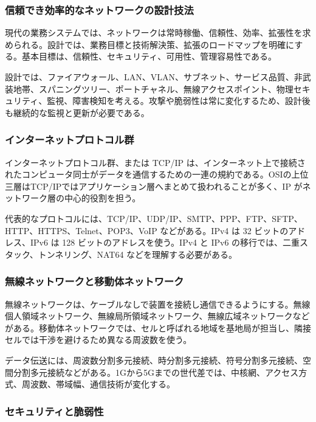 \documentclass[a4paper,11pt]{ltjsarticle}
\numberwithin{figure}{section}
\numberwithin{table}{section}
\begin{document}
\subsubsection{信頼でき効率的なネットワークの設計技法}

現代の業務システムでは、ネットワークは常時稼働、信頼性、効率、拡張性を求められる。設計では、業務目標と技術解決策、拡張のロードマップを明確にする。基本目標は、信頼性、セキュリティ、可用性、管理容易性である。

設計では、ファイアウォール、LAN、VLAN、サブネット、サービス品質、非武装地帯、スパニングツリー、ポートチャネル、無線アクセスポイント、物理セキュリティ、監視、障害検知を考える。攻撃や脆弱性は常に変化するため、設計後も継続的な監視と更新が必要である。

\subsubsection{インターネットプロトコル群}

インターネットプロトコル群、または TCP/IP は、インターネット上で接続されたコンピュータ同士がデータを通信するための一連の規約である。OSIの上位三層はTCP/IPではアプリケーション層へまとめて扱われることが多く、IP がネットワーク層の中心的役割を担う。

代表的なプロトコルには、TCP/IP、UDP/IP、SMTP、PPP、FTP、SFTP、HTTP、HTTPS、Telnet、POP3、VoIP などがある。IPv4 は 32 ビットのアドレス、IPv6 は 128 ビットのアドレスを使う。IPv4 と IPv6 の移行では、二重スタック、トンネリング、NAT64 などを理解する必要がある。

\subsubsection{無線ネットワークと移動体ネットワーク}

無線ネットワークは、ケーブルなしで装置を接続し通信できるようにする。無線個人領域ネットワーク、無線局所領域ネットワーク、無線広域ネットワークなどがある。移動体ネットワークでは、セルと呼ばれる地域を基地局が担当し、隣接セルでは干渉を避けるため異なる周波数を使う。

データ伝送には、周波数分割多元接続、時分割多元接続、符号分割多元接続、空間分割多元接続などがある。1Gから5Gまでの世代差では、中核網、アクセス方式、周波数、帯域幅、通信技術が変化する。

\subsubsection{セキュリティと脆弱性}
\end{document}
